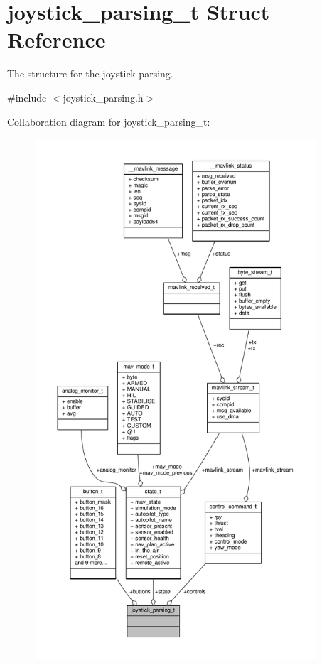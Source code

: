 \hypertarget{structjoystick__parsing__t}{\section{joystick\+\_\+parsing\+\_\+t Struct Reference}
\label{structjoystick__parsing__t}
}


The structure for the joystick parsing.  




{\ttfamily \#include $<$joystick\+\_\+parsing.\+h$>$}



Collaboration diagram for joystick\+\_\+parsing\+\_\+t\+:
\nopagebreak
\begin{figure}[H]
\begin{center}
\leavevmode
\includegraphics[height=550pt]{structjoystick__parsing__t__coll__graph}
\end{center}
\end{figure}
